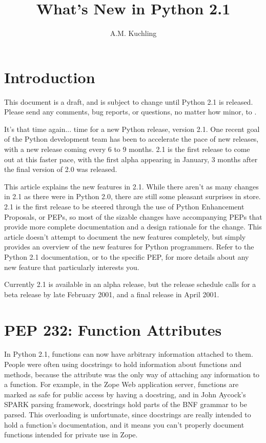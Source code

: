 \documentclass{howto}
\title{What's New in Python 2.1}
\author{A.M. Kuchling}
\begin{document}
\maketitle\tableofcontents

\section{Introduction}

{\large This document is a draft, and is subject to change until
Python 2.1 is released.  Please send any comments, bug reports, or questions,
no matter how minor, to .
}

It's that time again... time for a new Python release, version 2.1.
One recent goal of the Python development team has been to accelerate
the pace of new releases, with a new release coming every 6 to 9
months. 2.1 is the first release to come out at this faster pace, with
the first alpha appearing in January, 3 months after the final version
of 2.0 was released.

This article explains the new features in 2.1.  While there aren't as
many changes in 2.1 as there were in Python 2.0, there are still some
pleasant surprises in store.  2.1 is the first release to be steered
through the use of Python Enhancement Proposals, or PEPs, so most of
the sizable changes have accompanying PEPs that provide more complete
documentation and a design rationale for the change.  This article
doesn't attempt to document the new features completely, but simply
provides an overview of the new features for Python programmers.
Refer to the Python 2.1 documentation, or to the specific PEP, for
more details about any new feature that particularly interests you.

Currently 2.1 is available in an alpha release, but the release
schedule calls for a beta release by late February 2001, and a final
release in April 2001.

\section{PEP 232: Function Attributes}

In Python 2.1, functions can now have arbitrary
information attached to them.  People were often using docstrings to hold
information about functions and methods, because the 
attribute was the only way of attaching any information to a function.
For example, in the Zope Web application server, functions are marked
as safe for public access by having a docstring, and in John Aycock's
SPARK parsing framework, docstrings hold parts of the BNF grammar to
be parsed.  This overloading is unfortunate, since docstrings are
really intended to hold a function's documentation, and it 
means you
can't properly document functions intended for private use in Zope.
\end{document}
